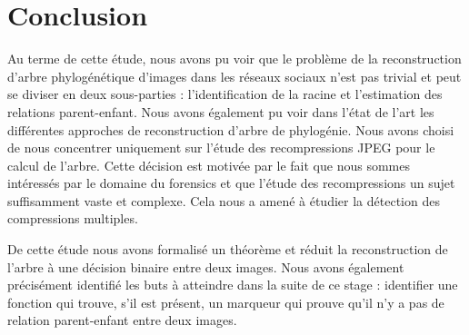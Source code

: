 \documentclass[utf8,final]{stageM2R} %
\begin{document}
\chapter{Conclusion}
\label{chap5}
Au terme de cette étude, nous avons pu voir que le problème de la reconstruction d'arbre phylogénétique d'images dans les réseaux sociaux n'est pas trivial et peut se diviser en deux sous-parties : l'identification de la racine et l'estimation des relations parent-enfant. Nous avons également pu voir dans l'état de l'art les différentes approches de reconstruction d'arbre de phylogénie. Nous avons choisi de nous concentrer uniquement sur l'étude des recompressions JPEG pour le calcul de l'arbre. Cette décision est motivée par le fait que nous sommes intéressés par le domaine du forensics et que l'étude des recompressions un sujet suffisamment vaste et complexe. Cela nous a amené à étudier la détection des compressions multiples.

De cette étude nous avons formalisé un théorème et réduit la reconstruction de l'arbre à une décision binaire entre deux images. Nous avons également précisément identifié les buts à atteindre dans la suite de ce stage : identifier une fonction qui trouve, s'il est présent, un marqueur qui prouve qu'il n'y a pas de relation parent-enfant entre deux images.
\printbibliography
\end{document}
